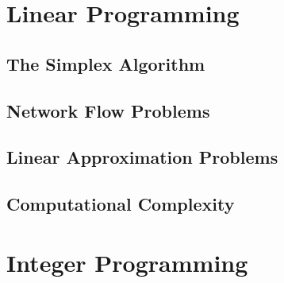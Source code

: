 \section{Linear Programming}\label{sec:lp}
\label{sec:lp-overview}

\subsection{The Simplex Algorithm}\label{sec:simplex}


\subsection{Network Flow Problems}\label{sec:xportation}


\subsection{Linear Approximation Problems}\label{sec:approx}


\subsection{Computational Complexity}\label{sec:complexity}


\section{Integer Programming}\label{sec:ip}

